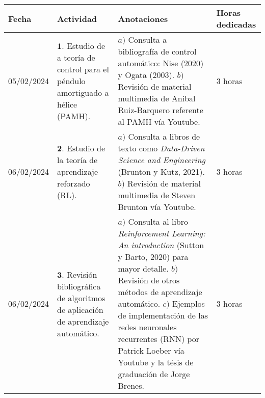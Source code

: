 \documentclass[12pt]{article}
\begin{document}
\begin{minipage}[h]{\textwidth}
	\centering
	\begin{tabularx}{\textwidth}{|p{2cm}|X|X|p{2cm}|} 
		\hline
		\rowcolor{encabezado}
		\textbf{Fecha} & 
		\textbf{Actividad} & 
		\textbf{Anotaciones} & 
		\textbf{Horas dedicadas} \\ \hline
		05/02/2024 & 
		$\mathbf{1}.$ Estudio de a teoría de control para el péndulo amortiguado a hélice (PAMH). & 
		$a)$ Consulta a bibliografía de control automático: Nise (2020) y Ogata (2003). \newline $b)$ Revisión de material multimedia de Anibal Ruiz-Barquero referente al PAMH vía Youtube. \newline & 
		3 horas \\
	 	06/02/2024 & 
	 	$\mathbf{2}.$ Estudio de la teoría de aprendizaje reforzado (RL). &
	 	$a)$ Consulta a libros de texto como \textit{Data-Driven Science and Engineering} (Brunton y Kutz, 2021). \newline $b)$ Revisión de material multimedia de Steven Brunton vía Youtube. \newline & 
	 	3 horas \\
	 	06/02/2024 & 
	 	$\mathbf{3}.$ Revisión bibliográfica de algoritmos de aplicación de aprendizaje automático. & 
	 	$a)$ Consulta al libro \textit{Reinforcement Learning: An introduction} (Sutton y Barto, 2020) para mayor detalle. \newline $b)$ Revisión de otros métodos de aprendizaje automático. \newline $c)$ Ejemplos de implementación de las redes neuronales recurrentes (RNN) por Patrick Loeber vía Youtube y la tésis de graduación de Jorge Brenes. & 
	 	3 horas \\
	 	
	 	\hline
	\end{tabularx}
\end{minipage}	 	
	 	
\end{document}
